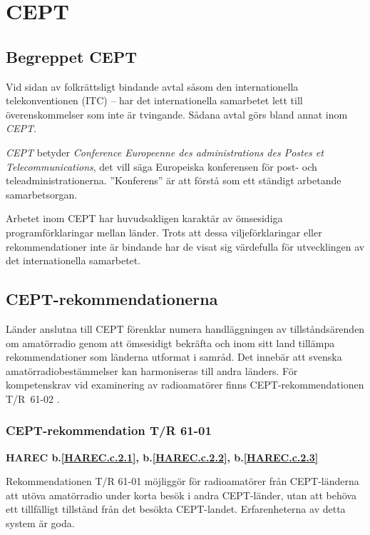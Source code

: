 
\section{CEPT}

\subsection{Begreppet CEPT}

Vid sidan av folkrättsligt bindande avtal såsom den internationella
telekonventionen (ITC) -- har det internationella samarbetet lett till
överenskommelser som inte är tvingande.
Sådana avtal görs bland annat inom \emph{CEPT}.

\emph{CEPT} betyder \emph{Conference Europeenne des administrations des
	Postes et Telecommunications}, det vill säga Europeiska konferensen
för post- och teleadministrationerna. ''Konferens'' är att förstå som
ett ständigt arbetande samarbetsorgan.

Arbetet inom CEPT har huvudsakligen karaktär av ömsesidiga programförklaringar
mellan länder.
Trots att dessa viljeförklaringar eller rekommendationer inte är bindande har de
visat sig värdefulla för utvecklingen av det internationella samarbetet.

\subsection{CEPT-rekommendationerna}

Länder anslutna till CEPT förenklar numera handläggningen av
tillståndsärenden om amatörradio genom att ömsesidigt bekräfta och
inom sitt land tillämpa rekommendationer som länderna utformat i
samråd.
Det innebär att svenska amatörradiobestämmelser kan harmoniseras till andra
länders.
För kompetenskrav vid examinering av radioamatörer finns CEPT-rekommendationen
T/R~61-02 \cite{TR6102}.

\subsubsection{CEPT-rekommendation T/R 61-01}
\textbf{
HAREC b.\ref{HAREC.c.2.1}\label{myHAREC.c.2.1},
 b.\ref{HAREC.c.2.2}\label{myHAREC.c.2.2},
 b.\ref{HAREC.c.2.3}\label{myHAREC.c.2.3}
}

Rekommendationen T/R 61-01 \cite{TR6101} möjliggör för radioamatörer från CEPT-länderna att utöva amatörradio under korta besök i andra CEPT-länder, utan att behöva ett tillfälligt tillstånd från det besökta CEPT-landet.
Erfarenheterna av detta system är goda.

